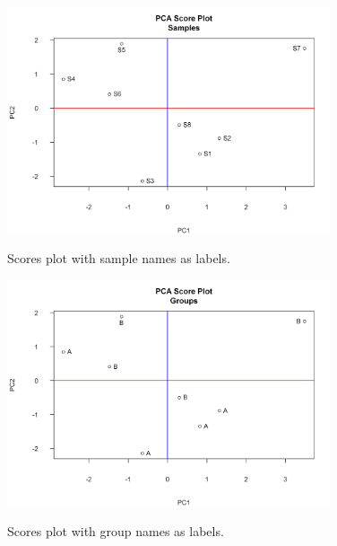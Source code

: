\documentclass[english,a4paper,12pt]{article}
\begin{document}
\begin{figure}[!h!tp]
    \centering
    \includegraphics[width=0.85\textwidth]{images/PCA_scores_smpl.png} \\
    \caption[PCA - Scores (by sample)]{Scores plot with sample names as labels.}
    \label{fig:PCA_scores_smpl}
\end{figure}

\begin{figure}[!h!bp]
    \centering
    \includegraphics[width=0.85\textwidth]{images/PCA_scores_grp.png} \\
    \caption[PCA - Scores (by group)]{Scores plot with group names as labels.}
    \label{fig:PCA_scores_grp}
\end{figure}
\end{document}
